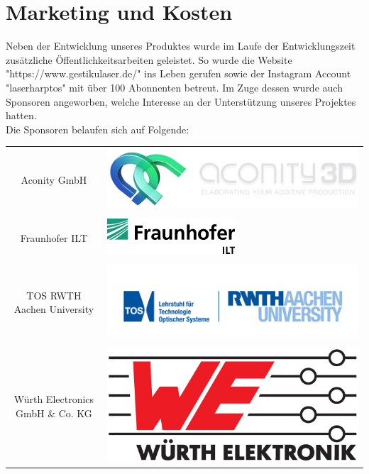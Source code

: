 \chapter{Marketing und Kosten}
\label{ch:Kosten}

Neben der Entwicklung unseres Produktes wurde im Laufe der Entwicklungszeit zusätzliche Öffentlichkeitsarbeiten geleistet. So wurde die Website "https://www.gestikulaser.de/" ins Leben gerufen sowie der Instagram Account "laserharptos" mit über 100 Abonnenten betreut. 
Im Zuge dessen wurde auch Sponsoren angeworben, welche Interesse an der Unterstützung unseres Projektes hatten. \\

Die Sponsoren belaufen sich auf Folgende: \\

\begin{tabular}{c l}
Aconity GmbH & \includegraphics[scale=0.5]{figures/AconityLogo.png} \\
& \\
Fraunhofer ILT & \includegraphics[scale=0.8]{figures/ILTLogo.png} \\
& \\
TOS RWTH Aachen University & \includegraphics[scale=0.5]{figures/TOSLogo.png} \\
& \\
Würth Electronics GmbH \& Co. KG& \includegraphics[scale=0.05]{figures/WuerthLogo.png}
\end{tabular} \\

